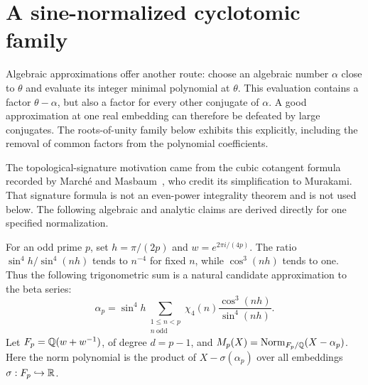 \section{A sine-normalized cyclotomic family}\label{sec:cyclotomic}
Algebraic approximations offer another route: choose an algebraic number
$\alpha$ close to $\theta$ and evaluate its integer minimal polynomial
at $\theta$. This evaluation contains a factor $\theta-\alpha$, but
also a factor for every other conjugate of $\alpha$. A good approximation
at one real embedding can therefore be defeated by large conjugates.
The roots-of-unity family below exhibits this explicitly, including
the removal of common factors from the polynomial coefficients.

The topological-signature motivation came from the cubic cotangent
formula recorded by March\'e and Masbaum~\cite[Corollary 3.2]{MarcheMasbaum},
who credit its simplification to Murakami. That signature formula is not
an even-power integrality theorem and is not used below.
The following algebraic and analytic claims are derived directly for
one specified normalization.

For an odd prime $p$, set $h=\pi/(2p)$ and $w=e^{2\pi i/(4p)}$.
The ratio $\sin^4h/\sin^4(nh)$ tends to $n^{-4}$ for fixed $n$,
while $\cos^3(nh)$ tends to one. Thus the following trigonometric
sum is a natural candidate approximation to the beta series:
\begin{equation}\label{eq:alpha}
 \alpha_p=\sin^4h\sum_{\substack{1\leq n<p\\n\ \text{odd}}}
             \chi_4(n)\frac{\cos^3(nh)}{\sin^4(nh)}.
\end{equation}
Let $F_p=\mathbb Q(w+w^{-1})$, of degree $d=p-1$, and
$M_p(X)=\operatorname{Norm}_{F_p/\mathbb Q}(X-\alpha_p)$.
Here the norm polynomial is the product of $X-\sigma(\alpha_p)$
over all embeddings $\sigma:F_p\hookrightarrow\mathbb R$.

